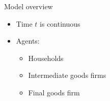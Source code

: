\documentclass[english,usenames,dvipsnames]{beamer}
\begin{document}


\begin{comment}
\section{Data}
\begin{frame}{Data}
\label{Data}
\begin{itemize}
	\item Have:
	\begin{itemize}
		\item Crunchbase full dataset: free dataset, 100,000+ startups (mostly founded in the last 20 years \hyperlink{crunchbase_founding_dates_coverage}{\beamerbutton{chart}}), information on founders and funding rounds. Some missing data, but more coverage of early stage startups than competing (expensive) datasets
		\item Moments from empirical work: e.g. brain drain in Marx 2015
		\item Survey data from Starr 2017 on prevalence of non-competes
		\item Data on strength of non-compete enforcement from Bishara 2011
	\end{itemize}
	\item Need / want: 
	\begin{itemize}
		\item Previous employment / occupation of founders in Crunchbase dataset. VentureOne has this, but it is not free.
		\item Better industry / product information classification -- need to merge with Crunchbase by firm name
		\item LEHD data would be great for comparing outcomes across different enforcement regions...but hard to come by. 
	\end{itemize}
\end{itemize}
\end{frame}
\end{comment}



\begin{frame}{Model overview}
\begin{itemize}
	\item Time $t$ is continuous 
	\item Agents:
	\begin{itemize}
		\item Households 
		\item Intermediate goods firms
		\item Final goods firm 
	\end{itemize}
\end{itemize}
\end{frame}
\end{document}
